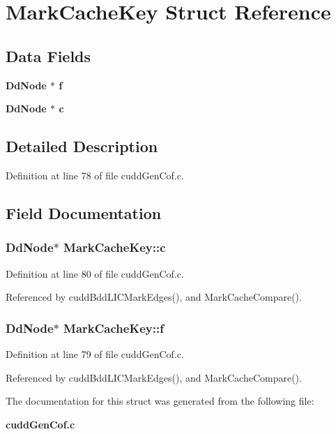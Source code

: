 \section{Mark\-Cache\-Key Struct Reference}
\label{structMarkCacheKey}
\subsection*{Data Fields}
\begin{CompactItemize}
\item 
\bf{Dd\-Node} $\ast$ \bf{f}
\item 
\bf{Dd\-Node} $\ast$ \bf{c}
\end{CompactItemize}


\subsection{Detailed Description}




Definition at line 78 of file cudd\-Gen\-Cof.c.

\subsection{Field Documentation}
\subsubsection{\setlength{\rightskip}{0pt plus 5cm}\bf{Dd\-Node}$\ast$ \bf{Mark\-Cache\-Key::c}}\label{structMarkCacheKey_06bf4f869966be347c5ac10292004cff}




Definition at line 80 of file cudd\-Gen\-Cof.c.

Referenced by cudd\-Bdd\-LICMark\-Edges(), and Mark\-Cache\-Compare().
\subsubsection{\setlength{\rightskip}{0pt plus 5cm}\bf{Dd\-Node}$\ast$ \bf{Mark\-Cache\-Key::f}}\label{structMarkCacheKey_8c719eb87ecb7f0b2f8ada1a375de814}




Definition at line 79 of file cudd\-Gen\-Cof.c.

Referenced by cudd\-Bdd\-LICMark\-Edges(), and Mark\-Cache\-Compare().

The documentation for this struct was generated from the following file:\begin{CompactItemize}
\item 
\bf{cudd\-Gen\-Cof.c}\end{CompactItemize}
